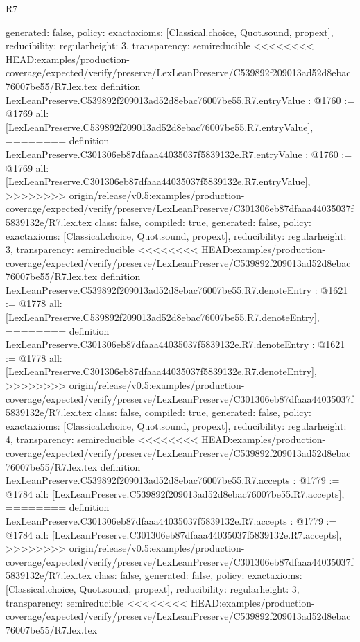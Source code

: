 \begin{lexlean}{R7}
\begin{coremodule}
{{{{{{{{{{{{{{{  generated: false,
  policy: exact{axioms: [Classical.choice, Quot.sound, propext]},
  reducibility: regular{height: 3},
  transparency: semireducible
}
<<<<<<<< HEAD:examples/production-coverage/expected/verify/preserve/LexLeanPreserve/C539892f209013ad52d8ebac76007be55/R7.lex.tex
definition LexLeanPreserve.C539892f209013ad52d8ebac76007be55.R7.entryValue : @1760 := @1769 {
  all: [LexLeanPreserve.C539892f209013ad52d8ebac76007be55.R7.entryValue],
========
definition LexLeanPreserve.C301306eb87dfaaa44035037f5839132e.R7.entryValue : @1760 := @1769 {
  all: [LexLeanPreserve.C301306eb87dfaaa44035037f5839132e.R7.entryValue],
>>>>>>>> origin/release/v0.5:examples/production-coverage/expected/verify/preserve/LexLeanPreserve/C301306eb87dfaaa44035037f5839132e/R7.lex.tex
  class: false,
  compiled: true,
  generated: false,
  policy: exact{axioms: [Classical.choice, Quot.sound, propext]},
  reducibility: regular{height: 3},
  transparency: semireducible
}
<<<<<<<< HEAD:examples/production-coverage/expected/verify/preserve/LexLeanPreserve/C539892f209013ad52d8ebac76007be55/R7.lex.tex
definition LexLeanPreserve.C539892f209013ad52d8ebac76007be55.R7.denoteEntry : @1621 := @1778 {
  all: [LexLeanPreserve.C539892f209013ad52d8ebac76007be55.R7.denoteEntry],
========
definition LexLeanPreserve.C301306eb87dfaaa44035037f5839132e.R7.denoteEntry : @1621 := @1778 {
  all: [LexLeanPreserve.C301306eb87dfaaa44035037f5839132e.R7.denoteEntry],
>>>>>>>> origin/release/v0.5:examples/production-coverage/expected/verify/preserve/LexLeanPreserve/C301306eb87dfaaa44035037f5839132e/R7.lex.tex
  class: false,
  compiled: true,
  generated: false,
  policy: exact{axioms: [Classical.choice, Quot.sound, propext]},
  reducibility: regular{height: 4},
  transparency: semireducible
}
<<<<<<<< HEAD:examples/production-coverage/expected/verify/preserve/LexLeanPreserve/C539892f209013ad52d8ebac76007be55/R7.lex.tex
definition LexLeanPreserve.C539892f209013ad52d8ebac76007be55.R7.accepts : @1779 := @1784 {
  all: [LexLeanPreserve.C539892f209013ad52d8ebac76007be55.R7.accepts],
========
definition LexLeanPreserve.C301306eb87dfaaa44035037f5839132e.R7.accepts : @1779 := @1784 {
  all: [LexLeanPreserve.C301306eb87dfaaa44035037f5839132e.R7.accepts],
>>>>>>>> origin/release/v0.5:examples/production-coverage/expected/verify/preserve/LexLeanPreserve/C301306eb87dfaaa44035037f5839132e/R7.lex.tex
  class: false,
  generated: false,
  policy: exact{axioms: [Classical.choice, Quot.sound, propext]},
  reducibility: regular{height: 3},
  transparency: semireducible
}
<<<<<<<< HEAD:examples/production-coverage/expected/verify/preserve/LexLeanPreserve/C539892f209013ad52d8ebac76007be55/R7.lex.tex
}}}}}}}}}}}}}}}}}
\end{coremodule}
\end{lexlean}
